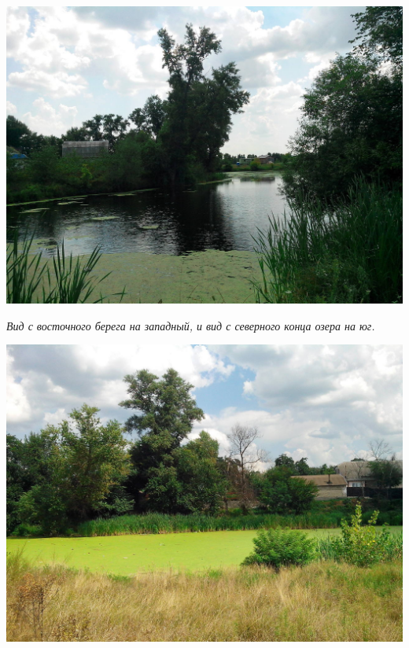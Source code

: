 \begin{center}
\includegraphics[width=\linewidth]{chast-gorodki/gnilusha/s_IMG_20140806_132801.jpg}

\textit{Вид с восточного берега на западный, и вид с северного конца озера на юг.}
\end{center}

\newpage
\vspace*{\fill}
\begin{center}
\includegraphics[width=\linewidth]{chast-gorodki/gnilusha/s_IMG_20140806_133316.jpg}
\end{center}

